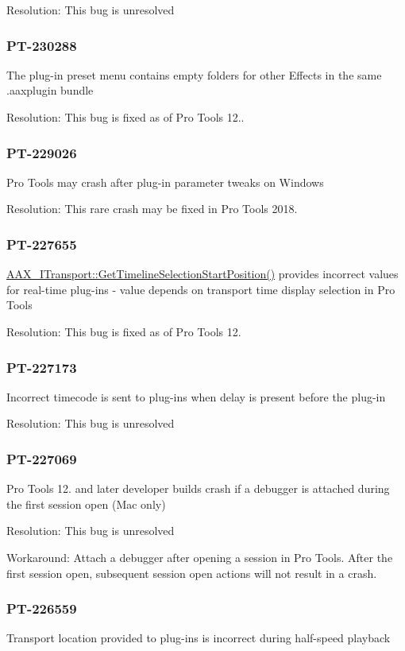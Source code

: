 Resolution\+: This bug is unresolved\hypertarget{a00374_PT-230288}{}\subsubsection{P\+T-\/230288}\label{a00374_PT-230288}
The plug-\/in preset menu contains empty folders for other Effects in the same .aaxplugin bundle

Resolution\+: This bug is fixed as of Pro Tools 12..\hypertarget{a00374_PT-229026}{}\subsubsection{P\+T-\/229026}\label{a00374_PT-229026}
Pro Tools may crash after plug-\/in parameter tweaks on Windows

Resolution\+: This rare crash may be fixed in Pro Tools 2018.\hypertarget{a00374_PT-227655}{}\subsubsection{P\+T-\/227655}\label{a00374_PT-227655}
\hyperlink{a00116_a639677fc4237183baac85d00f1a5f6d5}{A\+A\+X\+\_\+\+I\+Transport\+::\+Get\+Timeline\+Selection\+Start\+Position()} provides incorrect values for real-\/time plug-\/ins -\/ value depends on transport time display selection in Pro Tools

Resolution\+: This bug is fixed as of Pro Tools 12.\hypertarget{a00374_PT-227173}{}\subsubsection{P\+T-\/227173}\label{a00374_PT-227173}
Incorrect timecode is sent to plug-\/ins when delay is present before the plug-\/in

Resolution\+: This bug is unresolved\hypertarget{a00374_PT-227069}{}\subsubsection{P\+T-\/227069}\label{a00374_PT-227069}
Pro Tools 12. and later developer builds crash if a debugger is attached during the first session open (Mac only)

Resolution\+: This bug is unresolved

Workaround\+: Attach a debugger after opening a session in Pro Tools. After the first session open, subsequent session open actions will not result in a crash.\hypertarget{a00374_PT-226559}{}\subsubsection{P\+T-\/226559}\label{a00374_PT-226559}
Transport location provided to plug-\/ins is incorrect during half-\/speed playback

